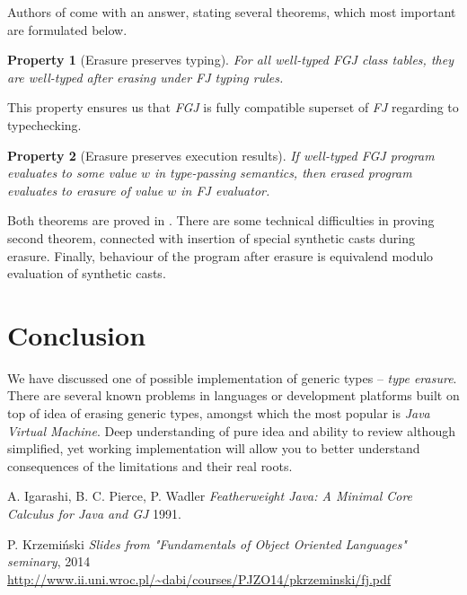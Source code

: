 \documentclass{article}[12pt]
\begin{document}
Authors of \cite{fj} come with an answer, stating several theorems, which most important are formulated below.
\newtheorem{theorem}{Property}
\begin{theorem}[Erasure preserves typing]
For all well-typed \emph{FGJ} class tables, they are well-typed after erasing under \emph{FJ} typing rules.
\end{theorem}
This property ensures us that \emph{FGJ} is fully compatible superset of \emph{FJ} regarding to typechecking.

\begin{theorem}[Erasure preserves execution results]
If well-typed \emph{FGJ} program evaluates to some value $w$ in type-passing semantics, then erased program evaluates to erasure of value $w$ in \emph{FJ} evaluator.
\end{theorem}

Both theorems are proved in \cite{fj}. There are some technical difficulties in proving second theorem, connected with insertion of special synthetic casts during erasure. Finally, behaviour of the program after erasure is equivalend modulo evaluation of synthetic casts.

\section{Conclusion}

We have discussed one of possible implementation of generic types -- \emph{type erasure}. There are several known problems in languages or development platforms built on top of idea of erasing generic types, amongst which the most popular is \emph{Java Virtual Machine}. Deep understanding of pure idea and ability to review although simplified, yet working implementation will allow you to better understand consequences of the limitations and their real roots. 

\begin{thebibliography}{1}

   A. Igarashi, B. C. Pierce, P. Wadler {\em Featherweight Java: A Minimal Core Calculus for Java and GJ}  1991.

   P. Krzemiński {\em Slides from "Fundamentals of Object Oriented Languages" seminary}, 2014 \\
    \url{http://www.ii.uni.wroc.pl/~dabi/courses/PJZO14/pkrzeminski/fj.pdf}


\end{thebibliography}
\end{document}
